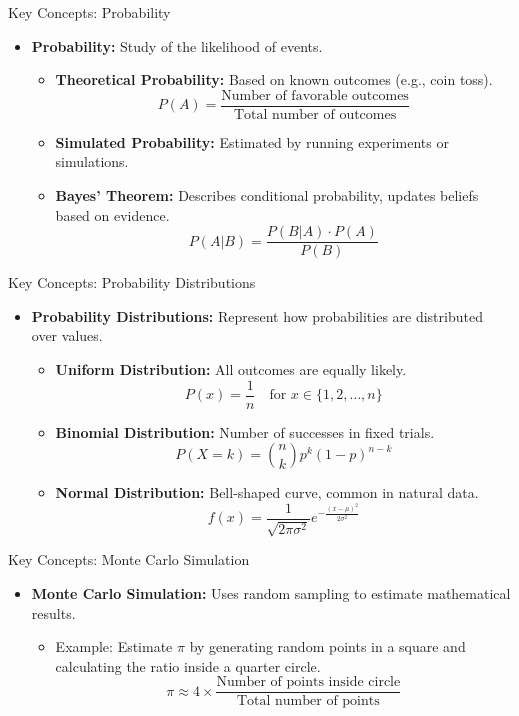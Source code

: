 \documentclass{beamer}
\begin{document}
\begin{frame}{Key Concepts: Probability}
\begin{itemize}
    \item \textbf{Probability:} Study of the likelihood of events.
    \begin{itemize}
        \item \textbf{Theoretical Probability:} Based on known outcomes (e.g., coin toss).
        $$ P(A) = \frac{\text{Number of favorable outcomes}}{\text{Total number of outcomes}} $$
        \item \textbf{Simulated Probability:} Estimated by running experiments or simulations.
        \item \textbf{Bayes' Theorem:} Describes conditional probability, updates beliefs based on evidence.
        $$ P(A|B) = \frac{P(B|A) \cdot P(A)}{P(B)} $$
    \end{itemize}
\end{itemize}
\end{frame}

\begin{frame}{Key Concepts: Probability Distributions}
\begin{itemize}
    \item \textbf{Probability Distributions:} Represent how probabilities are distributed over values.
    \begin{itemize}
        \item \textbf{Uniform Distribution:} All outcomes are equally likely.
        $$ P(x) = \frac{1}{n} \quad \text{for } x \in \{1, 2, \ldots, n\} $$
        \item \textbf{Binomial Distribution:} Number of successes in fixed trials.
        $$ P(X = k) = \binom{n}{k} p^k (1-p)^{n-k} $$
        \item \textbf{Normal Distribution:} Bell-shaped curve, common in natural data.
        $$ f(x) = \frac{1}{\sqrt{2\pi\sigma^2}} e^{-\frac{(x-\mu)^2}{2\sigma^2}} $$
    \end{itemize}
\end{itemize}
\end{frame}

\begin{frame}{Key Concepts: Monte Carlo Simulation}
\begin{itemize}
    \item \textbf{Monte Carlo Simulation:} Uses random sampling to estimate mathematical results.
    \begin{itemize}
        \item Example: Estimate $\pi$ by generating random points in a square and calculating the ratio inside a quarter circle.
        $$ \pi \approx 4 \times \frac{\text{Number of points inside circle}}{\text{Total number of points}} $$
    \end{itemize}
\end{itemize}
\end{frame}
\end{document}

